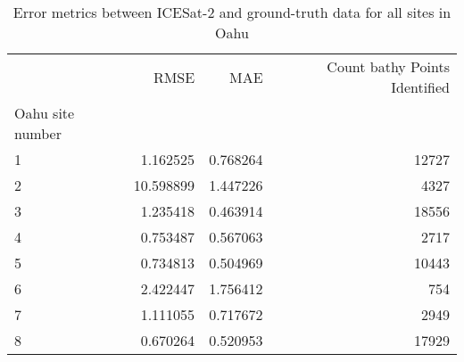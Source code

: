 \begin{table}[h!]
\caption{Error metrics between ICESat-2 and ground-truth data for all sites in Oahu}
\begin{tabular}{lrrr}
\toprule
 & RMSE & MAE & Count bathy Points Identified \\
Oahu site number &  &  &  \\
\midrule
1 & 1.162525 & 0.768264 & 12727 \\
2 & 10.598899 & 1.447226 & 4327 \\
3 & 1.235418 & 0.463914 & 18556 \\
4 & 0.753487 & 0.567063 & 2717 \\
5 & 0.734813 & 0.504969 & 10443 \\
6 & 2.422447 & 1.756412 & 754 \\
7 & 1.111055 & 0.717672 & 2949 \\
8 & 0.670264 & 0.520953 & 17929 \\
\bottomrule
\end{tabular}
\end{table}
